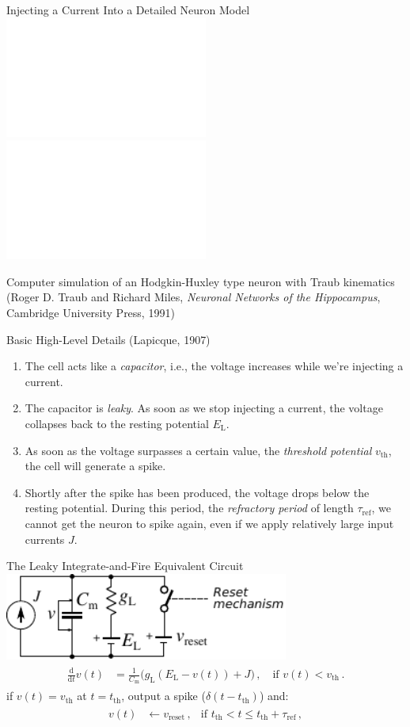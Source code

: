 \documentclass[handout,aspectratio=169]{beamer}
\begin{document}
\begin{frame}{Injecting a Current Into a Detailed Neuron Model}
	\includegraphics<1->[width=0.5\textwidth]{media/hh_neuron_sub_threshold.pdf}%
	\includegraphics<2->[width=0.5\textwidth]{media/hh_neuron_super_threshold.pdf}

	\centering
	{\tiny\color{aluminium4} Computer simulation of an Hodgkin-Huxley type neuron with Traub kinematics (Roger D. Traub and Richard Miles, \emph{Neuronal Networks of the Hippocampus},
	Cambridge University Press, 1991)}
\end{frame}

\begin{frame}{Basic High-Level Details (Lapicque, 1907)}
	\begin{enumerate}
		\item The cell acts like a \emph{capacitor}, i.e., the voltage increases while we're injecting a current.
		\item The capacitor is \emph{leaky}. As soon as we stop injecting a current, the voltage collapses back to the resting potential $E_\mathrm{L}$.
		\item As soon as the voltage surpasses a certain value, the \emph{threshold potential} $v_\mathrm{th}$, the cell will generate a spike.
		\item Shortly after the spike has been produced, the voltage drops below the resting potential. During this period, the \emph{refractory period} of length $\tau_\mathrm{ref}$, we cannot get the neuron to spike again, even if we apply relatively large input currents $J$.
	\end{enumerate}

\end{frame}

\begin{frame}{The Leaky Integrate-and-Fire Equivalent Circuit}
	\centering
	\includegraphics[width=0.7\textwidth]{media/lif_circuit.pdf}
	\begin{align}
		\begin{aligned}
			\frac{\mathrm{d}}{\mathrm{d}t} v(t) &= \frac{1}{C_\mathrm{m}} \big(g_\mathrm{L} (E_\mathrm{L} - v(t))
			+ J
			\big) \,, \quad \text{if } v(t) < v_\mathrm{th}\,.
		\end{aligned}
	\end{align}
	if $v(t) = v_\mathrm{th}$ at $t = t_\mathrm{th}$, output a spike ($\delta(t - t_\mathrm{th})$) and:
	\begin{align}
		\begin{aligned}
			v(t) &\gets v_\mathrm{reset} \,, &\text{if } t_\mathrm{th} < t \leq t_\mathrm{th} + \tau_\mathrm{ref} \,,
		\end{aligned}
		\label{eqn:super-threshold}
	\end{align}

\end{frame}
\end{document}
